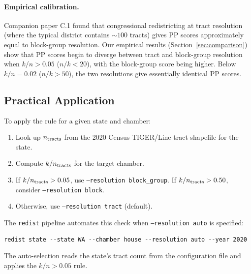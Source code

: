 \paragraph{Empirical calibration.}
Companion paper C.1 \citep{dellaLibera2026maup} found that congressional
redistricting at tract resolution (where the typical district contains
$\sim\!100$ tracts) gives PP scores approximately equal to block-group resolution.
Our empirical results (Section~\ref{sec:comparison}) show that PP scores begin
to diverge between tract and block-group resolution when $k/n > 0.05$
($n/k < 20$), with the block-group score being higher. Below $k/n = 0.02$
($n/k > 50$), the two resolutions give essentially identical PP scores.

\subsection{Practical Application}
\label{sec:rule:application}

To apply the rule for a given state and chamber:
\begin{enumerate}
  \item Look up $n_{\rm tracts}$ from the 2020 Census TIGER/Line tract shapefile
    for the state.
  \item Compute $k/n_{\rm tracts}$ for the target chamber.
  \item If $k/n_{\rm tracts} > 0.05$, use \texttt{--resolution block\_group}.
    If $k/n_{\rm tracts} > 0.50$, consider \texttt{--resolution block}.
  \item Otherwise, use \texttt{--resolution tract} (default).
\end{enumerate}

The \texttt{redist} pipeline automates this check when
\texttt{--resolution auto} is specified:
\begin{verbatim}
redist state --state WA --chamber house --resolution auto --year 2020
\end{verbatim}
The auto-selection reads the state's tract count from the configuration file
and applies the $k/n > 0.05$ rule.
